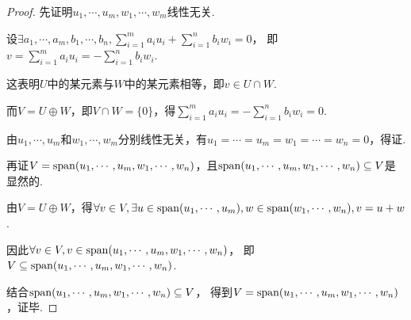 \begin{proof}
    先证明\(u_1,\cdots,u_m,w_1,\cdots,w_m\)线性无关.

    设\(\exists a_1,\cdots,a_m,b_1,\cdots,b_n,\sum_{i=1}^m a_iu_i+\sum_{i=1}^n b_iw_i=0\)，
    即\(v=\sum_{i=1}^m a_iu_i=-\sum_{i=1}^n b_iw_i\).
    
    这表明\(U\)中的某元素与\(W\)中的某元素相等，即\(v\in U\cap W\).
    
    而\(V=U\oplus W\)，即\(V\cap W=\{0\}\)，得\(\sum_{i=1}^m a_iu_i=-\sum_{i=1}^n b_iw_i=0\).
    
    由\(u_1,\cdots,u_m\)和\(w_1,\cdots,w_m\)分别线性无关，有\(u_1=\cdots=u_m=w_1=\cdots=w_n=0\)，得证.
    
    再证\(V=\operatorname{span}(u_1,\cdots,u_m,w_1,\cdots,w_n)\)，且\(\operatorname{span}(u_1,\cdots,u_m,w_1,\cdots,w_n) \subseteq V\)是显然的.
    
    由\(V=U\oplus W\)，得\(\forall v\in V,\exists u \in \operatorname{span}(u_1,\cdots,u_m),w \in \operatorname{span}(w_1,\cdots,w_n),v=u+w\).
    
    因此\(\forall v \in V,v \in \operatorname{span} (u_1,\cdots,u_m,w_1,\cdots,w_n)\)，
    即\(V \subseteq \operatorname{span}(u_1,\cdots,u_m,w_1,\cdots,w_n)\).
    
    结合\(\operatorname{span}(u_1,\cdots,u_m,w_1,\cdots,w_n) \subseteq V\)，
    得到\(V=\operatorname{span} (u_1,\cdots,u_m,w_1,\cdots,w_n)\)，证毕.
\end{proof}

